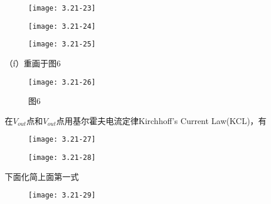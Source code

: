 \begin{figure}[H] %
	\begin{minipage}{\linewidth}
		\texttt{[image: 3.21-23]}
	\end{minipage}
\end{figure}

\begin{figure}[H] %
	\begin{minipage}{\linewidth}
		\texttt{[image: 3.21-24]}
	\end{minipage}
\end{figure}

\begin{figure}[H] %
	\begin{minipage}{\linewidth}
		\texttt{[image: 3.21-25]}
	\end{minipage}
\end{figure}

\scalebox{3}{（f）}

（f）重画于图6

\begin{figure}[H] %
	\begin{minipage}{\linewidth}
		\texttt{[image: 3.21-26]}
	\end{minipage}
	\caption*{图6} %
\end{figure}

在$V_{out}$点和$V_{out}$点用基尔霍夫电流定律Kirchhoff’s Current Law(KCL)，有

\begin{figure}[H] %
	\begin{minipage}{\linewidth}
		\texttt{[image: 3.21-27]}
	\end{minipage}
\end{figure}

\begin{figure}[H] %
	\begin{minipage}{\linewidth}
		\texttt{[image: 3.21-28]}
	\end{minipage}
\end{figure}

下面化简上面第一式

\begin{figure}[H] %
	\begin{minipage}{\linewidth}
		\texttt{[image: 3.21-29]}
	\end{minipage}
\end{figure}

